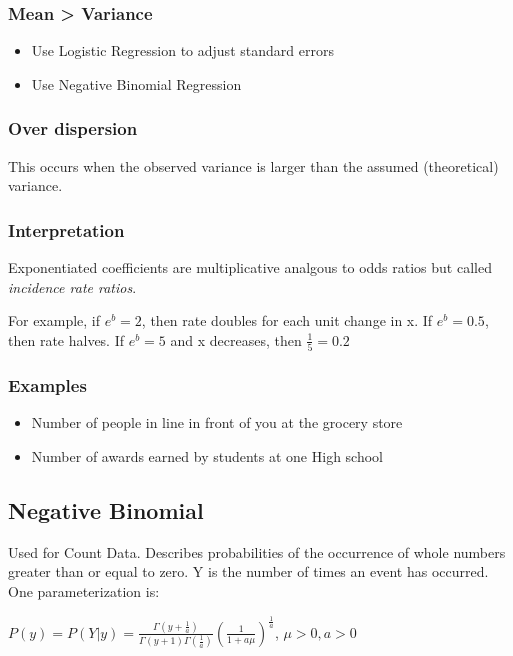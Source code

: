 \documentclass[11pt]{article}
\begin{document}
\subsubsection{Mean > Variance}
\label{sec:org1accf42}
\begin{itemize}
\item Use Logistic Regression to adjust standard errors
\item Use Negative Binomial Regression
\end{itemize}

\subsubsection{Over dispersion}
\label{sec:orge281343}
This occurs when the observed variance is larger than the assumed (theoretical) variance.

\subsubsection{Interpretation}
\label{sec:orgf452836}
Exponentiated coefficients are multiplicative analgous to odds ratios but called
\emph{incidence rate ratios}.

For example, if \(e^b = 2\), then rate doubles for each unit change in x. If \(e^b
= 0.5\), then rate halves. If \(e^b = 5\) and x decreases, then \(\frac{1}{5} = 0.2\)

\subsubsection{Examples}
\label{sec:org7a4fd6a}
\begin{itemize}
\item Number of people in line in front of you at the grocery store
\item Number of awards earned by students at one High school
\end{itemize}

\subsection{Negative Binomial}
\label{sec:orga9ad612}
Used for Count Data. Describes probabilities of the occurrence of whole numbers greater than or equal
to zero. Y is the number of times an event has occurred. One parameterization
is:

\(P(y) = P(Y | y) = \frac{\Gamma (y + \frac{1}{a})}{\Gamma (y + 1) \Gamma
(\frac{1}{a})} (\frac{1}{1 + a \mu})^{\frac{1}{a}}\), \(\mu > 0, a > 0\)
\end{document}
